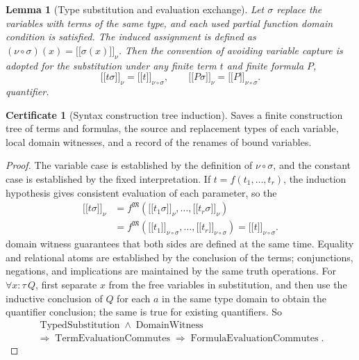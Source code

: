 \documentclass[12pt,a4paper,openany,notitlepage]{report}
\theoremstyle{plain}
\newtheorem{lemma}[theorem]{Lemma}
\theoremstyle{definition}
\newtheorem*{certificate}{Certificate}
\theoremstyle{remark}
\begin{document}
\begin{CJK*}
\begin{lemma}
[Type substitution and evaluation exchange]\label{exp:logic:substitution}
Let $\sigma$ replace the variables with terms of the same type, and each used partial function domain condition is satisfied. The induced assignment is defined as $(\nu\circ\sigma)(x)=\lbrack\!\lbrack\sigma(x)\rbrack\!\rbrack_\nu$. Then the convention of avoiding variable capture is adopted for the substitution under any finite term $t$ and finite formula $P$, \[
 \lbrack\!\lbrack t\sigma\rbrack\!\rbrack_\nu
 =\lbrack\!\lbrack t\rbrack\!\rbrack_{\nu\circ\sigma},\qquad
 \lbrack\!\lbrack P\sigma\rbrack\!\rbrack_\nu
 =\lbrack\!\lbrack P\rbrack\!\rbrack_{\nu\circ\sigma}.
\] quantifier.\end{lemma}
\begin{certificate}
[Syntax construction tree induction]Saves a finite construction tree of terms and formulas, the source and replacement types of each variable, local domain witnesses, and a record of the renames of bound variables.\end{certificate}
\begin{proof}
The variable case is established by the definition of $\nu\circ\sigma$, and the constant case is established by the fixed interpretation. If $t=f(t_1,\ldots,t_r)$, the induction hypothesis gives consistent evaluation of each parameter, so the \[
 \begin{aligned}
 \lbrack\!\lbrack t\sigma\rbrack\!\rbrack_\nu
 &=f^{\mathfrak M}(\lbrack\!\lbrack t_1\sigma\rbrack\!\rbrack_\nu,
                    \ldots,\lbrack\!\lbrack t_r\sigma\rbrack\!\rbrack_\nu)\\
 &=f^{\mathfrak M}(\lbrack\!\lbrack t_1\rbrack\!\rbrack_{\nu\circ\sigma},
                    \ldots,\lbrack\!\lbrack t_r\rbrack\!\rbrack_{\nu\circ\sigma})
 =\lbrack\!\lbrack t\rbrack\!\rbrack_{\nu\circ\sigma}.
 \end{aligned}
\] domain witness guarantees that both sides are defined at the same time. Equality and relational atoms are established by the conclusion of the terms; conjunctions, negations, and implications are maintained by the same truth operations. For $\forall x:\tau\,Q$, first separate $x$ from the free variables in substitution, and then use the inductive conclusion of $Q$ for each $a$ in the same type domain to obtain the quantifier conclusion; the same is true for existing quantifiers. So \[
 \begin{gathered}
 \operatorname{TypedSubstitution}\land\operatorname{DomainWitness}\\
 \Rightarrow\operatorname{TermEvaluationCommutes}
 \Rightarrow\operatorname{FormulaEvaluationCommutes}.
 \end{gathered}
\]\end{proof}



\end{CJK*}
\end{document}
